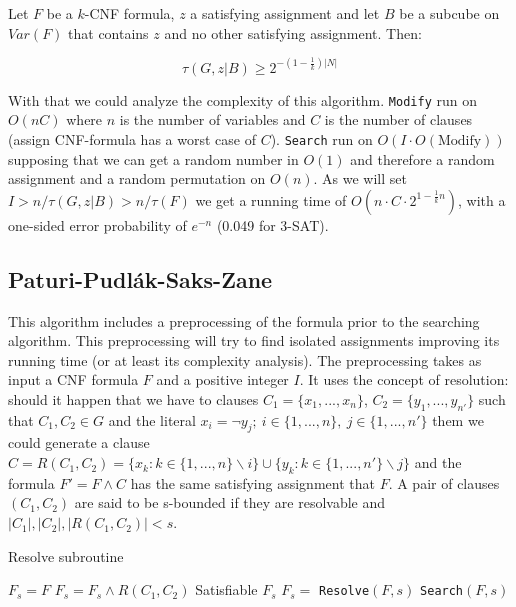 \begin{theorem}  Let $F$ be a $k$-CNF formula, $z$ a satisfying assignment and let $B$ be a subcube on $Var(F)$ that contains $z$ and no other satisfying assignment. Then:

  $$ \tau(G, z|B) \ge 2^{-(1-\frac{1}{k})|N|}$$
\end{theorem}


With that we could analyze the complexity of this algorithm. \texttt{Modify} run on $O(nC)$ where $n$ is the number of variables and $C$ is the number of clauses (assign CNF-formula has a worst case of $C$).  \texttt{Search} run on $O(I\cdot O(\text{Modify}))$ supposing that we can get a random number in $O(1)$ and therefore a random assignment and a  random permutation on $O(n)$. As we will set $I> n/\tau(G,z|B)>n/\tau(F)$ we get a running time of $O(n\cdot C\cdot 2^{1-\frac{1}{k}n})$, with a one-sided error probability of $e^{-n}$ (0.049 for 3-SAT).


\subsection{Paturi-Pudlák-Saks-Zane}

This algorithm includes a preprocessing of the formula prior to the searching algorithm. This preprocessing will try to find isolated assignments improving its running time (or at least its complexity analysis). The preprocessing takes as input a CNF formula $F$ and a positive integer $I$. It uses the concept of resolution: should it happen that we have to clauses $C_1 = \{x_1,...,x_n\}$, $C_2 = \{y_1,...,y_{n'}\}$  such that $C_1,C_2 \in G$ and the literal $x_i = \neg y_j; \ i\in\{1,...,n\},\ j \in \{1,...,n'\} $ them we could generate a clause $C = R(C_1,C_2) = \{x_k : k \in\{1,...,n\}\backslash i\} \cup \{y_k : k \in\{1,...,n'\}\backslash j\}$ and the formula $F' = F \wedge C$ has the same satisfying assignment that $F$. A pair of clauses $(C_1,C_2)$ are said to be s-bounded if they are resolvable and $|C_1|,|C_2|, |R(C_1,C_2)| < s$.

\begin{algorithm}
  \caption{Resolve subroutine}\label{alg:resolve}
  \begin{algorithmic}[1]
    \State $F_s = F$
    \State $F_s  = F_s \wedge R(C_1, C_2)$
    \EndWhile
    \State \Return Satisfiable
    \State \Return $F_s$
    \EndProcedure
    \State
    \State $F_s =$ \texttt{Resolve}$(F,s)$
    \State \Return \texttt{Search}$(F,s)$

  \end{algorithmic}
\end{algorithm}

